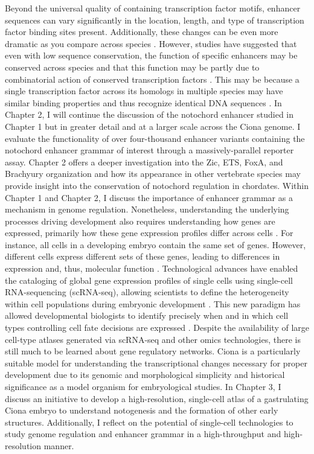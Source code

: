 \begin{dissertationintroduction}
    Beyond the universal quality of containing transcription factor motifs, enhancer sequences can vary significantly in the location, length, and type of transcription factor binding sites present. Additionally, these changes can be even more dramatic as you compare across species \cite{villar2015, ward2012, wong2020}. However, studies have suggested that even with low sequence conservation, the function of specific enhancers may be conserved across species and that this function may be partly due to combinatorial action of conserved transcription factors \cite{claussnitzer2014, wong2020}. This may be because a single transcription factor across its homologs in multiple species may have similar binding properties and thus recognize identical DNA sequences \cite{peter2011, wong2020}. In Chapter 2, I will continue the discussion of the notochord enhancer studied in Chapter 1 but in greater detail and at a larger scale across the Ciona genome. I evaluate the functionality of over four-thousand enhancer variants containing the notochord enhancer grammar of interest through a massively-parallel reporter assay. Chapter 2 offers a deeper investigation into the Zic, ETS, FoxA, and Brachyury organization and how its appearance in other vertebrate species may provide insight into the conservation of notochord regulation in chordates.
    Within Chapter 1 and Chapter 2, I discuss the importance of enhancer grammar as a mechanism in genome regulation. Nonetheless, understanding the underlying processes driving development also requires understanding how genes are expressed, primarily how these gene expression profiles differ across cells \cite{peter2011}. For instance, all cells in a developing embryo contain the same set of genes. However, different cells express different sets of these genes, leading to differences in expression and, thus, molecular function \cite{arnone1997, peter2011}. Technological advances have enabled the cataloging of global gene expression profiles of single cells using single-cell RNA-sequencing (scRNA-seq), allowing scientists to define the heterogeneity within cell populations during embryonic development \cite{klein2015, macosko2015, olsen2018}. This new paradigm has allowed developmental biologists to identify precisely when and in which cell types controlling cell fate decisions are expressed \cite{klein2019}. Despite the availability of large cell-type atlases generated via scRNA-seq and other omics technologies, there is still much to be learned about gene regulatory networks. Ciona is a particularly suitable model for understanding the transcriptional changes necessary for proper development due to its genomic and morphological simplicity and historical significance as a model organism for embryological studies. In Chapter 3, I discuss an initiative to develop a high-resolution, single-cell atlas of a gastrulating Ciona embryo to understand notogenesis and the formation of other early structures. Additionally, I reflect on the potential of single-cell technologies to study genome regulation and enhancer grammar in a high-throughput and high-resolution manner. 
    

\end{dissertationintroduction}
